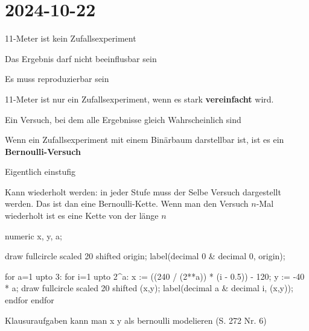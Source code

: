 \section{2024-10-22}

11-Meter ist kein Zufallsexperiment

\startitemize[packed]
\item Das Ergebnis darf nicht beeinflusbar sein
\item Es muss reproduzierbar sein
\stopitemize

11-Meter ist nur ein Zufallsexperiment, wenn es stark {\bf vereinfacht} wird.

\startframedtipp
Ein Versuch, bei dem alle Ergebnisse gleich Wahrscheinlich sind
\stopframedtipp

\startframedtipp
Wenn ein Zufallsexperiment mit einem Binärbaum darstellbar ist, ist es ein {\bf Bernoulli-Versuch}

\startitemize[packed]
\item Eigentlich einstufig
\item Kann wiederholt werden: in jeder Stufe muss der Selbe Versuch dargestellt werden. Das ist dan eine Bernoulli-Kette. Wenn man den Versuch $n$-Mal wiederholt ist es eine Kette von der länge $n$
\stopitemize
\stopframedtipp


\startMPpage

numeric x, y, a;

%


draw fullcircle scaled 20 shifted origin;
label(decimal 0 & decimal 0, origin);

for a=1 upto 3:
	for i=1 upto 2^a:
		x := ((240 / (2**a)) * (i - 0.5)) - 120;  %
		y := -40 * a;
		draw fullcircle scaled 20 shifted (x,y);
		label(decimal a & decimal i, (x,y));
	endfor
endfor

\stopMPpage
\stopbuffer


\startframedtipp
Klausuraufgaben kann man x y als bernoulli modelieren (S. 272 Nr. 6)
\stopframedtipp
